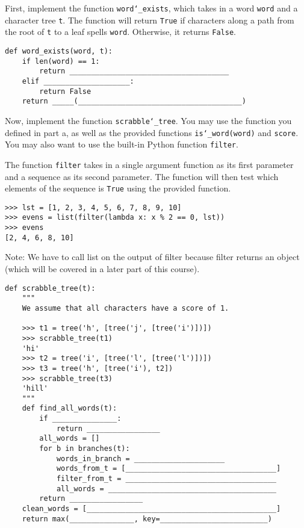 \begin{parts}
\item First, implement the function \texttt{word\char`_exists}, which takes in a word \texttt{word} and a character tree \texttt{t}. The function will return \texttt{True} if characters along a path from the root of \texttt{t} to a leaf spells \texttt{word}. Otherwise, it returns \texttt{False}.

\begin{lstlisting}
def word_exists(word, t):
    if len(word) == 1:
        return _____________________________________
    elif ____________________:
        return False
    return _____(______________________________________)

\end{lstlisting}

\item Now, implement the function \texttt{scrabble\char`_tree}. You may use the function you defined in part a, as well as the provided functions \texttt{is\char`_word(word)} and \texttt{score}. You may also want to use the built-in Python function \texttt{filter}.

The function \texttt{filter} takes in a single argument function as its first parameter and a sequence as its second parameter. The function will then test which elements of the sequence is \texttt{True} using the provided function.

\begin{lstlisting}
>>> lst = [1, 2, 3, 4, 5, 6, 7, 8, 9, 10]
>>> evens = list(filter(lambda x: x % 2 == 0, lst))
>>> evens
[2, 4, 6, 8, 10]
\end{lstlisting}

Note: We have to call list on the output of filter because filter returns an object (which will be covered in a later part of this course).

\newpage
\begin{lstlisting}
def scrabble_tree(t):
    """
    We assume that all characters have a score of 1.

    >>> t1 = tree('h', [tree('j', [tree('i')])])
    >>> scrabble_tree(t1)
    'hi'
    >>> t2 = tree('i', [tree('l', [tree('l')])])
    >>> t3 = tree('h', [tree('i'), t2])
    >>> scrabble_tree(t3)
    'hill'
    """
    def find_all_words(t):
        if _______________:
            return _________________
        all_words = []
        for b in branches(t):
            words_in_branch = _____________________
            words_from_t = [___________________________________]
            filter_from_t = ___________________________________
            all_words = _______________________________________
        return _________________
    clean_words = [____________________________________________]
    return max(_______________, key=_________________________)

\end{lstlisting}
\end{parts}

